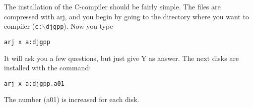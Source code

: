 The installation of the C-compiler should be fairly simple. The files
are compressed with arj, and you begin by going to the directory where
you want to compiler ({\tt c:$\backslash$djgpp}). Now you type

\begin{verbatim}
arj x a:djgpp
\end{verbatim}

It will ask you a few questions, but just give Y as answer. The next
disks are installed with the command:

\begin{verbatim}
arj x a:djgpp.a01
\end{verbatim}

The number (a01) is increased for each disk.



